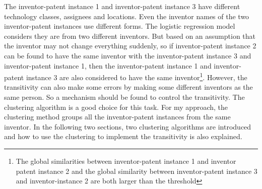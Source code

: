 The inventor-patent instance 1 and inventor-patent instance 3 have different technology classes, assignees and locations. Even the inventor names of the two inventor-patent instances use different forms. The logistic regression model considers they are from two different inventors. But based on an assumption that the inventor may not change everything suddenly, so if inventor-patent instance 2 can be found to have the same inventor with the inventor-patent instance 3 and inventor-patent instance 1, then the inventor-patent instance 1 and inventor-patent instance 3 are also considered to have the same inventor\footnote{The global similarities between inventor-patent instance 1 and inventor patent instance 2 and the global similarity between inventor-patent instance 3 and inventor-instance 2 are both larger than the threshold}. However, the transitivity can also make some errors by making some different inventors as the same person. So a mechanism should be found to control the transitivity. The clustering algorithm is a good choice for this task. For my approach, the clustering method groups all the inventor-patent instances from the same inventor. In the following two sections, two clustering algorithms are introduced and how to use the clustering to implement the transitivity is also explained.

